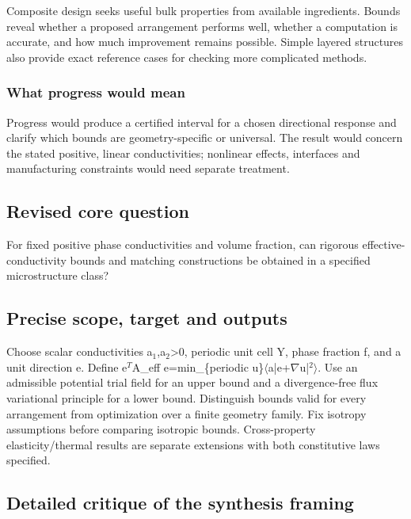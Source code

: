 \documentclass[
  11pt,
]{article}
\begin{document}
Composite design seeks useful bulk properties from available
ingredients. Bounds reveal whether a proposed arrangement performs well,
whether a computation is accurate, and how much improvement remains
possible. Simple layered structures also provide exact reference cases
for checking more complicated methods.

\subsubsection{What progress would mean}

Progress would produce a certified interval for a chosen directional
response and clarify which bounds are geometry-specific or universal.
The result would concern the stated positive, linear conductivities;
nonlinear effects, interfaces and manufacturing constraints would need
separate treatment.

\subsection{Revised core question}

For fixed positive phase conductivities and volume fraction, can
rigorous effective-conductivity bounds and matching constructions be
obtained in a specified microstructure class?

\subsection{Precise scope, target and outputs}

Choose scalar conductivities
a\ensuremath{{}_{1}},a\ensuremath{{}_{2}}>0, periodic unit cell Y, phase
fraction f, and a unit direction e. Define e\ensuremath{{}^{T}}A\_eff
e=min\_\{periodic
u\}\ensuremath{\langle}a|e+\ensuremath{\nabla}u|\ensuremath{{}^{2}}\ensuremath{\rangle}.
Use an admissible potential trial field for an upper bound and a
divergence-free flux variational principle for a lower bound.
Distinguish bounds valid for every arrangement from optimization over a
finite geometry family. Fix isotropy assumptions before comparing
isotropic bounds. Cross-property elasticity/thermal results are separate
extensions with both constitutive laws specified.

\subsection{Detailed critique of the synthesis framing}
\end{document}
